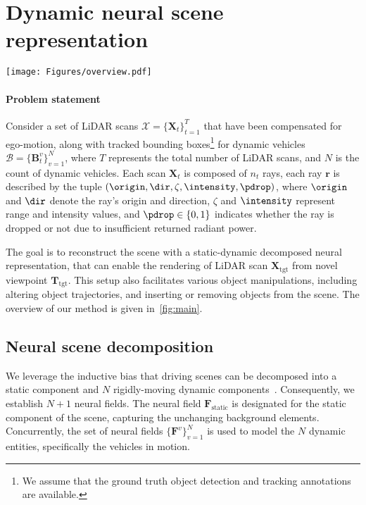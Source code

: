 \section{Dynamic neural scene representation}

\begin{figure*}[t]
    \centering
        \texttt{[image: Figures/overview.pdf]}
        \caption{
        Overview of \dynfl. Our method takes LiDAR scans and tracked bounding boxes of dynamic vehicles as input. \dynfl first decomposes the scene into a static background and $N$ dynamic vehicles, each modelled using a dedicated neural field. These neural fields are then composed to re-simulate LiDAR scans in dynamic scenes. Our composition technique supports various scene edits, including altering object trajectories, removing and adding reconstructed neural assets between scenes.
    }
    \label{fig:main}
\end{figure*}
\paragraph{Problem statement} 
Consider a set of LiDAR scans $\mathcal{X} = \{\mathbf{X}_t\}_{t=1}^T$ that have been compensated for ego-motion, along with tracked bounding boxes\footnote{We assume that the ground truth object detection and tracking annotations are available.} for dynamic vehicles $\mathcal{B} = \{\mathbf{B}_t^v\}_{v=1}^{N}$, where $T$ represents the total number of LiDAR scans, and $N$ is the count of dynamic vehicles. Each scan $\mathbf{X}_t$ is composed of $n_t$ rays, each ray $\mathbf{r}$ is described by the tuple $(\origin, \dir, \zeta, \intensity, \pdrop)$, where $\origin$ and $\dir$ denote the ray's origin and direction, $\zeta$ and $\intensity$ represent range and intensity values, and $\pdrop \in \{0,1\}$ indicates whether the ray is dropped or not due to insufficient returned radiant power.


The goal is to reconstruct the scene with a static-dynamic decomposed neural representation, that can enable the rendering of LiDAR scan $\mathbf{X}_{\text{tgt}}$ from novel viewpoint $\mathbf{T}_{\text{tgt}}$. This setup also facilitates various object manipulations, including altering object trajectories, and inserting or removing objects from the scene. The overview of our method is given in~\cref{fig:main}.

\subsection{Neural scene decomposition} \label{sec: decomposition}
We leverage the inductive bias that driving scenes can be decomposed into a static component and $N$ rigidly-moving dynamic components~\cite{huang2022dynamic,gojcic2021weakly}. Consequently, we establish $N+1$ neural fields. The neural field $\mathbf{F}_{\text{static}}$ is designated for the static component of the scene, capturing the unchanging background elements. Concurrently, the set of neural fields $\{\mathbf{F}^v\}_{v=1}^{N}$ is used to model the $N$ dynamic entities, specifically the vehicles in motion.



